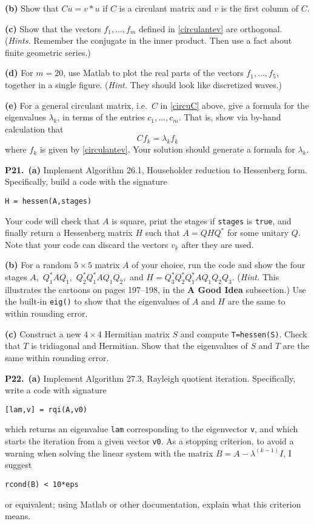 \documentclass[12pt]{amsart}
\newcommand{\prob}[1]{\bigskip\noindent\textbf{#1.}\quad }
\newcommand{\epart}[1]{\medskip\noindent\textbf{(#1)}\quad }
\newcommand{\ppart}[1]{\,\textbf{(#1)}\quad }
\begin{document}
\epart{b} Show that $C u = v\ast u$ if $C$ is a circulant matrix and $v$ is the first column of $C$.

\epart{c}  Show that the vectors $f_1,\dots,f_m$ defined in \eqref{circulantev} are orthogonal.  (\emph{Hints.}  Remember the conjugate in the inner product.  Then use a fact about finite geometric series.)

\epart{d}  For $m=20$, use Matlab to plot the real parts of the vectors $f_1,\dots,f_5$, together in a single figure.  (\emph{Hint.} They should look like discretized waves.)

\epart{e}  For a general circulant matrix, i.e.~$C$ in \eqref{circuC} above, give a formula for the eigenvalues $\lambda_k$, in terms of the entries $c_1,\dots,c_m$.  That is, show via by-hand calculation that
    $$C f_k = \lambda_k f_k$$
where $f_k$ is given by \eqref{circulantev}.  Your solution should generate a formula for $\lambda_k$.


\prob{P21}  \ppart{a}  Implement Algorithm 26.1, Householder reduction to Hessenberg form.  Specifically, build a code with the signature

\begin{center}
\verb|H = hessen(A,stages)|
\end{center}

\noindent Your code will check that $A$ is square, print the stages if \verb|stages| is \verb|true|, and finally return a Hessenberg matrix $H$ such that $A=QHQ^*$ for some unitary $Q$.  Note that your code can discard the vectors $v_k$ after they are used.

\epart{b}  For a random $5\times 5$ matrix $A$ of your choice, run the code and show the four stages $A$,\, $Q_1^*AQ_1$,\, $Q_2^*Q_1^*AQ_1Q_2$,\, and $H=Q_3^*Q_2^*Q_1^*AQ_1Q_2Q_3$.  (\emph{Hint.}  This illustrates the cartoons on pages 197--198, in the \textbf{A Good Idea} subsection.)  Use the built-in \texttt{eig()} to show that the eigenvalues of $A$ and $H$ are the same to within rounding error.

\epart{c}  Construct a new $4\times 4$ Hermitian matrix $S$ and compute \verb|T=hessen(S)|.  Check that $T$ is tridiagonal and Hermitian.  Show that the eigenvalues of $S$ and $T$ are the same within rounding error.


\prob{P22}  \ppart{a}  Implement Algorithm 27.3, Rayleigh quotient iteration.  Specifically, write a code with signature
\begin{center}
\verb|[lam,v] = rqi(A,v0)|
\end{center}
which returns an eigenvalue \verb|lam| corresponding to the eigenvector \verb|v|, and which starts the iteration from a given vector \verb|v0|.  As a stopping criterion, to avoid a warning when solving the linear system with the matrix $B=A-\lambda^{(k-1)} I$, I suggest
\begin{center}
\verb|rcond(B) < 10*eps|
\end{center}
or equivalent; using Matlab or other documentation, explain what this criterion means.
\end{document}
